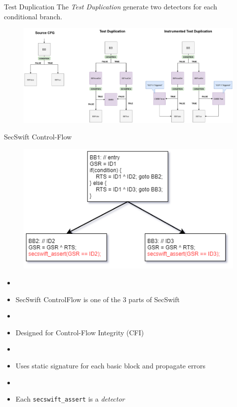 \begin{frame}{Test Duplication} 
    The \textit{Test Duplication} generate two detectors for each conditional branch.

    \vspace{0.5cm}

    \begin{figure}
        \includegraphics[scale=0.2]{img/test-duplication-scheme-complete-old.png}
    \end{figure}
\end{frame}

\begin{frame}{SecSwift Control-Flow} 
    \begin{figure}
        \includegraphics[scale=0.3]{img/secswift-CF.png}
    \end{figure}
    
    \begin{itemize}
        \item []
        \item[] SecSwift ControlFlow is one of the 3 parts of SecSwift\cite{Ferriere/LLVM19}
        \item []
        \item Designed for Control-Flow Integrity (CFI)
        \item[]
        \item Uses static signature for each basic block and propagate errors
        \item[]
        \item Each \lstinline{secswift_assert} is a \emph{detector}
    \end{itemize}
    \vfill
\end{frame}


